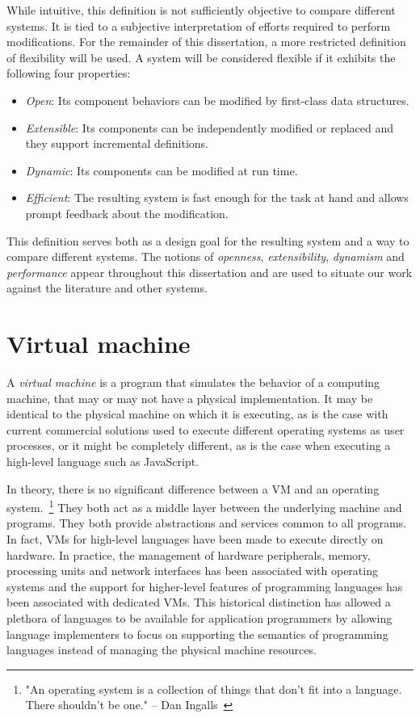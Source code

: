 While intuitive, this definition is not sufficiently objective to compare
different systems. It is tied to a subjective interpretation of efforts
required to perform modifications. For the remainder of this dissertation, a
more restricted definition of flexibility will be used. A system will be
considered flexible if it exhibits the following four properties:

\begin{itemize}
    \item \textit{Open}: Its component behaviors can be modified by first-class
        data structures. 
    \item \textit{Extensible}: Its components can be independently modified or
        replaced and they support incremental definitions. 
    \item \textit{Dynamic}: Its components can be modified at run time.
    \item \textit{Efficient}: The resulting system is fast enough for the task
        at hand and allows prompt feedback about the modification.
\end{itemize}

This definition serves both as a design goal for the resulting system and a way
to compare different systems. The notions of \textit{openness},
\textit{extensibility}, \textit{dynamism} and \textit{performance} appear
throughout this dissertation and are used to situate our work against the
literature and other systems.

\section{Virtual machine}

A \textit{virtual machine} is a program that simulates the behavior of a
computing machine, that may or may not have a physical implementation. It may
be identical to the physical machine on which it is executing, as is the case
with current commercial solutions used to execute different operating systems
as user processes, or it might be completely different, as is the case when
executing a high-level language such as JavaScript.  

In theory, there is no significant difference between a VM and
an operating system.~\footnote{"An operating system is a collection of
things that don't fit into a language. There shouldn't be one." -- Dan
Ingalls~\cite{Ingalls1981}} They both act as a middle layer between the
underlying machine and programs. They both provide abstractions and
services common to all programs. In fact, VMs for high-level
languages have been made to execute directly on hardware. In practice, the
management of hardware peripherals, memory, processing units and network
interfaces has been associated with operating systems and the support for
higher-level features of programming languages has been associated with
dedicated VMs. This historical distinction has allowed a plethora
of languages to be available for application programmers by allowing language
implementers to focus on supporting the semantics of programming languages
instead of managing the physical machine resources.

